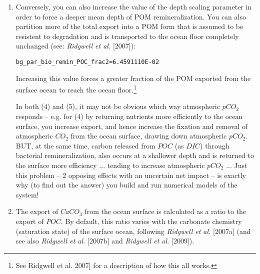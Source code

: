 \begin{enumerate}[noitemsep]
\newpage
%
\item Conversely, you can also increase the value of the depth scaling parameter in order to force a deeper mean depth of POM remineralization. You can also partition more of the total export into a POM form that is assumed to be resistent to degradation and is transported to the ocean floor completely unchanged (see: \textit{Ridgwell et al.} [2007]):
\vspace{-1pt}\small\begin{verbatim}
bg_par_bio_remin_POC_frac2=6.4591110E-02
\end{verbatim}\normalsize\vspace{-1pt}
Increasing this value forces a greater fraction of the POM exported from the surface ocean to reach the ocean floor.\footnote{See Ridgwell et al. 2007] for a description of how this all works.}

\vspace{1mm}
In both (4) and (5), it may not be obvious which way atmospheric \(pCO_{2}\) responds -- e.g. for (4) by returning nutrients more efficiently to the ocean surface, you increase export, and hence increase the fixation and removal of atmospheric \(CO_{2}\) from the ocean surface, drawing down atmospheric \(pCO_{2}\). BUT, at the same time, carbon released from \(POC\) (as \(DIC\)) through bacterial remineralization, also occurs at a shallower depth and is returned to the surface more efficiency ... tending to increase atmospheric \(pCO_{2}\) ... Just this problem -- 2 opposing effects with an uncertain net impact -- is exactly why (to find out the answer) you build and run numerical models of the system!

\vspace{1mm}
\item The export of \(CaCO_{3}\) from the ocean surface is calculated as a ratio to the export of \(POC\). By default, this ratio varies with the carbonate chemistry (saturation state) of the surface ocean, following \textit{Ridgwell et al.} [2007a] (and see also \textit{Ridgwell et al.} [2007b] and \textit{Ridgwell et al.} [2009]). 


\end{enumerate}
